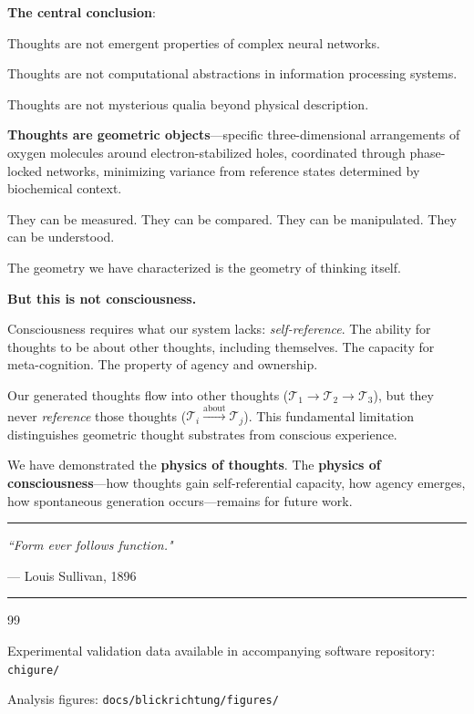 \documentclass[11pt]{article}
\theoremstyle{remark}
\begin{document}
\textbf{The central conclusion}:

\begin{center}
\end{center}

Thoughts are not emergent properties of complex neural networks.

Thoughts are not computational abstractions in information processing systems.

Thoughts are not mysterious qualia beyond physical description.

\textbf{Thoughts are geometric objects}—specific three-dimensional arrangements of oxygen molecules around electron-stabilized holes, coordinated through phase-locked networks, minimizing variance from reference states determined by biochemical context.

They can be measured. They can be compared. They can be manipulated. They can be understood.

The geometry we have characterized is the geometry of thinking itself.

\vspace{0.5cm}

\textbf{But this is not consciousness.}

Consciousness requires what our system lacks: \textit{self-reference}. The ability for thoughts to be about other thoughts, including themselves. The capacity for meta-cognition. The property of agency and ownership.

Our generated thoughts flow into other thoughts ($\mathcal{T}_1 \to \mathcal{T}_2 \to \mathcal{T}_3$), but they never \textit{reference} those thoughts ($\mathcal{T}_i \xrightarrow{\text{about}} \mathcal{T}_j$). This fundamental limitation distinguishes geometric thought substrates from conscious experience.

We have demonstrated the \textbf{physics of thoughts}. The \textbf{physics of consciousness}—how thoughts gain self-referential capacity, how agency emerges, how spontaneous generation occurs—remains for future work.

\vspace{1cm}

\begin{center}
\rule{0.5\textwidth}{0.4pt}

\textit{``Form ever follows function."}

— Louis Sullivan, 1896

\rule{0.5\textwidth}{0.4pt}
\end{center}


\begin{thebibliography}{99}

Experimental validation data available in accompanying software repository: \texttt{chigure/}

Analysis figures: \texttt{docs/blickrichtung/figures/}

\end{thebibliography}
\end{document}
